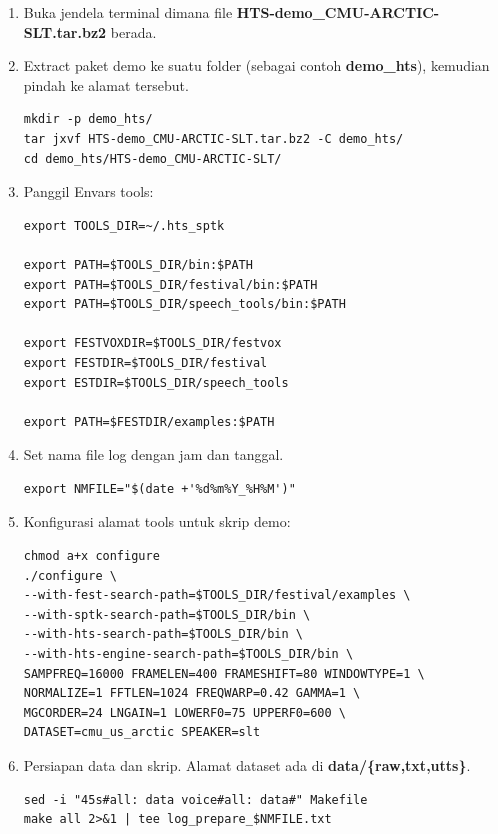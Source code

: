 \documentclass[12pt,]{article}
\begin{document}
	\begin{enumerate}
		\item Buka jendela terminal dimana file \textbf{HTS-demo\_CMU-ARCTIC-SLT.tar.bz2} berada.

		\item Extract paket demo ke suatu folder (sebagai contoh \textbf{demo\_hts}), kemudian pindah ke alamat tersebut.
		\begin{verbatim}
mkdir -p demo_hts/
tar jxvf HTS-demo_CMU-ARCTIC-SLT.tar.bz2 -C demo_hts/
cd demo_hts/HTS-demo_CMU-ARCTIC-SLT/
		\end{verbatim}

		\item Panggil Envars tools:
		\begin{verbatim}
export TOOLS_DIR=~/.hts_sptk

export PATH=$TOOLS_DIR/bin:$PATH
export PATH=$TOOLS_DIR/festival/bin:$PATH
export PATH=$TOOLS_DIR/speech_tools/bin:$PATH

export FESTVOXDIR=$TOOLS_DIR/festvox
export FESTDIR=$TOOLS_DIR/festival
export ESTDIR=$TOOLS_DIR/speech_tools

export PATH=$FESTDIR/examples:$PATH
		\end{verbatim}

		\newpage
		\item Set nama file log dengan jam dan tanggal.
		\begin{verbatim}
export NMFILE="$(date +'%d%m%Y_%H%M')"
		\end{verbatim}

		\item Konfigurasi alamat tools untuk skrip demo:
		\begin{verbatim}
chmod a+x configure
./configure \
--with-fest-search-path=$TOOLS_DIR/festival/examples \
--with-sptk-search-path=$TOOLS_DIR/bin \
--with-hts-search-path=$TOOLS_DIR/bin \
--with-hts-engine-search-path=$TOOLS_DIR/bin \
SAMPFREQ=16000 FRAMELEN=400 FRAMESHIFT=80 WINDOWTYPE=1 \
NORMALIZE=1 FFTLEN=1024 FREQWARP=0.42 GAMMA=1 \
MGCORDER=24 LNGAIN=1 LOWERF0=75 UPPERF0=600 \
DATASET=cmu_us_arctic SPEAKER=slt
		\end{verbatim}

		\item Persiapan data dan skrip.
		Alamat dataset ada di \textbf{data/\{raw,txt,utts\}}.
		\begin{verbatim}
sed -i "45s#all: data voice#all: data#" Makefile
make all 2>&1 | tee log_prepare_$NMFILE.txt
		\end{verbatim}


\end{enumerate}
\end{document}
